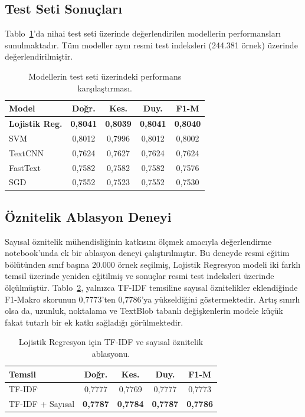 \documentclass[conference]{IEEEtran}
\begin{document}
\subsection{Test Seti Sonuçları}

Tablo~\ref{tab:test_sonuc}'da nihai test seti üzerinde değerlendirilen modellerin performansları sunulmaktadır. Tüm modeller aynı resmi test indeksleri (244.381 örnek) üzerinde değerlendirilmiştir.

\begin{table}[htbp]
\centering
\caption{Modellerin test seti üzerindeki performans karşılaştırması.}
\label{tab:test_sonuc}
\small
\begin{tabular}{lcccc}
\toprule
\textbf{Model} & \textbf{Doğr.} & \textbf{Kes.} & \textbf{Duy.} & \textbf{F1-M} \\
\midrule
\textbf{Lojistik Reg.} & \textbf{0,8041} & \textbf{0,8039} & \textbf{0,8041} & \textbf{0,8040} \\
SVM & 0,8012 & 0,7996 & 0,8012 & 0,8002 \\
TextCNN & 0,7624 & 0,7627 & 0,7624 & 0,7624 \\
FastText & 0,7582 & 0,7582 & 0,7582 & 0,7576 \\
SGD & 0,7552 & 0,7523 & 0,7552 & 0,7530 \\
\bottomrule
\end{tabular}
\end{table}


\subsection{Öznitelik Ablasyon Deneyi}

Sayısal öznitelik mühendisliğinin katkısını ölçmek amacıyla değerlendirme notebook'unda ek bir ablasyon deneyi çalıştırılmıştır. Bu deneyde resmi eğitim bölütünden sınıf başına 20.000 örnek seçilmiş, Lojistik Regresyon modeli iki farklı temsil üzerinde yeniden eğitilmiş ve sonuçlar resmi test indeksleri üzerinde ölçülmüştür. Tablo~\ref{tab:ablation}, yalnızca TF-IDF temsiline sayısal öznitelikler eklendiğinde F1-Makro skorunun 0,7773'ten 0,7786'ya yükseldiğini göstermektedir. Artış sınırlı olsa da, uzunluk, noktalama ve TextBlob tabanlı değişkenlerin modele küçük fakat tutarlı bir ek katkı sağladığı görülmektedir.

\begin{table}[htbp]
\centering
\caption{Lojistik Regresyon için TF-IDF ve sayısal öznitelik ablasyonu.}
\label{tab:ablation}
\small
\begin{tabular}{lcccc}
\toprule
\textbf{Temsil} & \textbf{Doğr.} & \textbf{Kes.} & \textbf{Duy.} & \textbf{F1-M} \\
\midrule
TF-IDF & 0,7777 & 0,7769 & 0,7777 & 0,7773 \\
TF-IDF + Sayısal & \textbf{0,7787} & \textbf{0,7784} & \textbf{0,7787} & \textbf{0,7786} \\
\bottomrule
\end{tabular}
\end{table}
\end{document}
